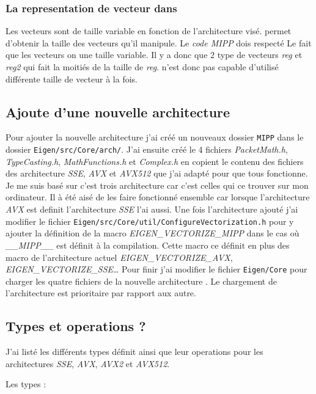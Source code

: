 \subsubsection{La representation de vecteur dans \MIPP}
{
  Les vecteurs sont de taille variable en fonction de l'architecture visé. \MIPP permet
  d'obtenir la taille des vecteurs qu'il manipule. Le \emph{code MIPP} dois respecté
  Le fait que les vecteurs on une taille variable. Il y a donc que 2 type de vecteurs
  \emph{reg} et \emph{reg2} qui fait la moitiés de la taille de \emph{reg}.
  \MIPP n'est donc pas capable d'utilisé différente taille de vecteur à la fois.
}

\subsection{Ajoute d'une nouvelle architecture \MIPP}

Pour ajouter la nouvelle architecture \MIPP j'ai créé un nouveaux dossier \verb|MIPP|
dans le dossier \verb|Eigen/src/Core/arch/|. J'ai ensuite créé le 4 fichiers
\emph{PacketMath.h}, \emph{TypeCasting.h}, \emph{MathFunctions.h} et \emph{Complex.h}
en copient le contenu des fichiers des architecture \emph{SSE}, \emph{AVX} et \emph{AVX512}
que j'ai adapté pour que tous fonctionne. Je me suis basé sur c'est trois architecture
car c'est celles qui ce trouver sur mon ordinateur. Il à été aisé de les faire fonctionné
ensemble car lorsque l'architecture \emph{AVX} est definit l'architecture \emph{SSE} l'ai
aussi.
Une fois l'architecture ajouté j'ai modifier le fichier
\verb|Eigen/src/Core/util/ConfigureVectorization.h| pour y ajouter la définition de la
macro \emph{EIGEN_VECTORIZE_MIPP} dans le cas où \emph{__MIPP__} est définit à la
compilation. Cette macro ce définit en plus des macro de l'architecture actuel
\emph{EIGEN_VECTORIZE_AVX}, \emph{EIGEN_VECTORIZE_SSE}\dots
Pour finir j'ai modifier le fichier \verb|Eigen/Core| pour charger les quatre fichiers
de la nouvelle architecture \MIPP. Le chargement de l'architecture \MIPP est prioritaire
par rapport aux autre.

\subsection{Types et operations \Eigen ?}

J'ai listé les différents types \Eigen définit ainsi que leur operations pour les
architectures \emph{SSE}, \emph{AVX}, \emph{AVX2} et \emph{AVX512}.

Les types :

